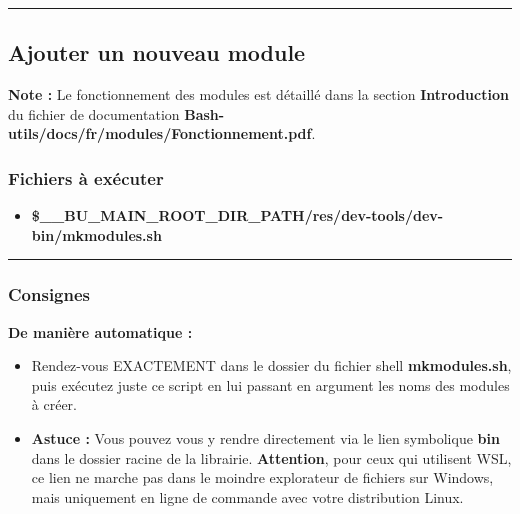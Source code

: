\documentclass[a4paper,10pt]{article}
\begin{document}

    \color{sec2}\par\noindent\rule{\textwidth}{0.4pt}\color{text}

    \color{sec2}
    \subsection{Ajouter un nouveau module}\color{text}

    \begin{justify}
        \textbf{Note :} Le fonctionnement des modules est détaillé dans la section \textbf{\color{sec1}Introduction} du fichier de documentation \textbf{\color{path}Bash-utils/docs/fr/modules/Fonctionnement.pdf}.
    \end{justify}

    \color{sec3}
    \subsubsection{Fichiers à exécuter}\color{text}

    \begin{itemize}
        \item \textbf{\color{vars}\$\_\_BU\_MAIN\_ROOT\_DIR\_PATH\color{path}/res/dev-tools/dev-bin/mkmodules.sh}\\[1\baselineskip]
    \end{itemize}



    \color{sec3}\par\noindent\rule{\textwidth}{0.4pt}\color{text}

    \color{sec3}
    \subsubsection{Consignes}\color{text}

    \begin{justify}
        \textbf{De manière automatique :}

        \begin{itemize}
            \item Rendez-vous EXACTEMENT dans le dossier du fichier shell \textbf{\color{path}mkmodules.sh}, puis exécutez juste ce script en lui passant en argument les noms des modules à créer.\\\mbox{}

            \item \textbf{Astuce :} Vous pouvez vous y rendre directement via le lien symbolique \textbf{\color{path}bin} dans le dossier racine de la librairie. \textbf{Attention}, pour ceux qui utilisent WSL, ce lien ne marche pas dans le moindre explorateur de fichiers sur Windows, mais uniquement en ligne de commande avec votre distribution Linux.
        \end{itemize}
    \end{justify}
\end{document}
